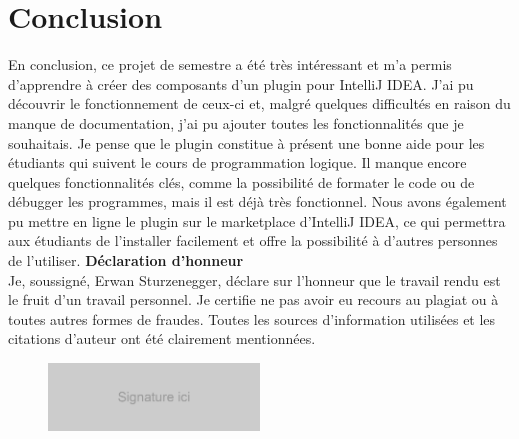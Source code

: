 \chapter{Conclusion}
\noindent En conclusion, ce projet de semestre a été très intéressant et m'a permis d'apprendre à créer des composants d'un plugin pour IntelliJ IDEA. J'ai pu découvrir le fonctionnement de ceux-ci et, malgré quelques difficultés en raison du manque de documentation, j'ai pu ajouter toutes les fonctionnalités que je souhaitais. 
\newdoubleline Je pense que le plugin constitue à présent une bonne aide pour les étudiants qui suivent le cours de programmation logique. Il manque encore quelques fonctionnalités clés, comme la possibilité de formater le code ou de débugger les programmes, mais il est déjà très fonctionnel.
\newdoubleline Nous avons également pu mettre en ligne le plugin sur le marketplace d'IntelliJ IDEA, ce qui permettra aux étudiants de l'installer facilement et offre la possibilité à d'autres personnes de l'utiliser.
\newdoubleline
\newdoubleline
\textbf{Déclaration d’honneur}
\\Je, soussigné, Erwan Sturzenegger, déclare sur l’honneur que le travail rendu est le fruit d’un travail personnel. Je certifie ne pas avoir eu recours au plagiat ou à toutes autres formes de fraudes. Toutes les sources d’information utilisées et les citations d’auteur ont été clairement mentionnées.
\begin{figure}[H]
    \centering
    \includegraphics[width=0.5\textwidth]{images/signature.png}
\end{figure}